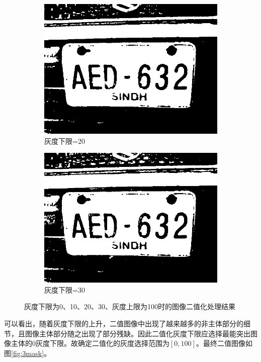 \documentclass[a4paper]{ctexart}
\newcommand{\outwfour}{0.23\textwidth}
\begin{document}
\begin{spacing}{1.35}
\begin{figure}[htbp]
\begin{subfigure}[t]{\outwfour}
			\includegraphics[width=\textwidth]{figure/3mask_2_3.png}
			\caption{灰度下限=20}
		\end{subfigure}
		\begin{subfigure}[t]{\outwfour}
			\centering
			\includegraphics[width=\textwidth]{figure/3mask_2_4.png}
			\caption{灰度下限=30}
		\end{subfigure}
		\caption{灰度下限为0、10、20、30、灰度上限为100时的图像二值化处理结果}
		\label{fig:3mask_2}
	\end{figure}
	可以看出，随着灰度下限的上升，二值图像中出现了越来越多的非主体部分的细节，且图像主体部分随之出现了部分残缺。因此二值化灰度下限应选择最能突出图像主体的0灰度下限。故确定二值化的灰度选择范围为$\left[0,100\right]$。最终二值图像如图\ref{fig:3mask}。

\end{spacing}
\end{document}
